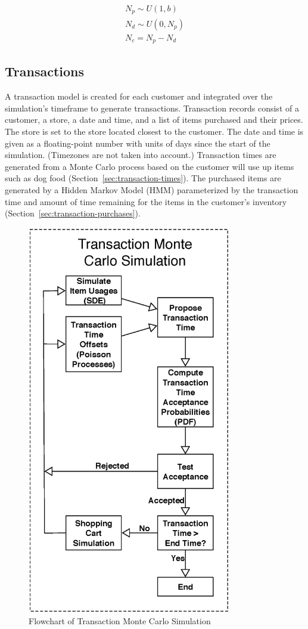 \documentclass[conference]{IEEEtran}
\begin{document}
\begin{align}
N_p \sim U(1, b) \\
N_d \sim U(0, N_p) \nonumber \\
N_c = N_p - N_d \nonumber
\end{align}

\subsection{Transactions}
A transaction model is created for each customer and integrated over the simulation's timeframe to generate transactions. Transaction records consist of a customer, a store, a date and time, and a list of items purchased and their prices.  The store is set to the store located closest to the customer. The date and time is given as a floating-point number with units of days since the start of the simulation.  (Timezones are not taken into account.)  Transaction times are generated from a Monte Carlo process based on the customer will use up items such as dog food (Section~\ref{sec:transaction-times}).  The purchased items are generated by a Hidden Markov Model (HMM) parameterized by the transaction time and amount of time remaining for the items in the customer's inventory (Section~\ref{sec:transaction-purchases}).

\begin{figure}[!t]
  \centering
  \includegraphics[width=3.5in]{figures/transaction_simulation.eps}
  \caption{Flowchart of Transaction Monte Carlo Simulation}
  \label{fig:trans_sim}
\end{figure}
\end{document}
